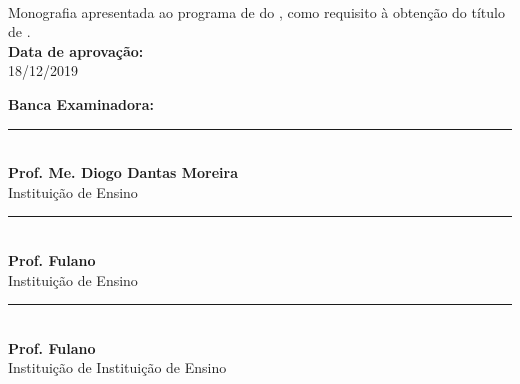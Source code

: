 %
%

\makeatletter
\begin{folhadeaprovacao}
	
	\thispagestyle{empty}%
	
	\begin{center}
		
		\small\textbf{\expandafter\uppercase\expandafter{\imprimirnomeautor}}\\
		\vspace*{3.0 cm}%
		\normalsize\textbf{\expandafter\uppercase\expandafter{\imprimirtitulotb}}
		
	\end{center}
	
	\vspace*{0.35 cm}%
	\large%
	\hfill%
	\begin{minipage}{10 cm}%
		\begin{small} %
			\setlength{\baselineskip}{\baselineskip}
			
			
			{Monografia apresentada ao programa de {\textbf{\imprimirprograma}}
				do {\textbf{\imprimirinstituicao}},
				como requisito à obtenção do título de
				{\textbf{\imprimirgrau}}.}\\
			
			{\textbf{Data de aprovação:}\\
				18/12/2019
			}
			\vspace*{1.0 cm}
		
			{\textbf{Banca Examinadora:}\\
				
				\vspace*{1.0 cm}
				
				\rule{\linewidth}{.1 mm}\\
				{\textbf{Prof. Me. Diogo Dantas Moreira}\\
					Instituição de Ensino
				}
			
				\vspace*{1.0 cm}

				\rule{\linewidth}{.1 mm}\\
				{\textbf{Prof. Fulano}\\
					Instituição de Ensino
				}
			
				\vspace*{1.0 cm}
				
				\rule{\linewidth}{.1 mm}\\
				{\textbf{Prof. Fulano}\\
					Instituição de
				Instituição de Ensino}
			}
			

\end{small}
\end{minipage}
\end{folhadeaprovacao}
